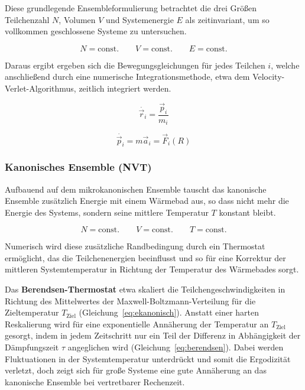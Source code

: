 Diese grundlegende Ensembleformulierung betrachtet die drei Größen Teilchenzahl $N$, Volumen $V$ und Systemenergie $E$ als zeitinvariant, um so vollkommen geschlossene Systeme zu untersuchen.

\begin{equation}
  N = \text{const.}
  \qquad
  V = \text{const.}
  \qquad
  E = \text{const.}
\end{equation}

Daraus ergibt ergeben sich die Bewegungsgleichungen für jedes Teilchen $i$, welche anschließend durch eine numerische Integrationsmethode, etwa dem Velocity-Verlet-Algorithmus, zeitlich integriert werden.

\begin{equation}
  \dot{\vec r_i} = \frac{\vec p_i}{m_i}
\end{equation}

\begin{equation}
  \dot{\vec p_i} = m \vec a_i = \vec F_i(R)
\end{equation}

\subsubsection{Kanonisches Ensemble (NVT)}

Aufbauend auf dem mikrokanonischen Ensemble tauscht das kanonische Ensemble zusätzlich Energie mit einem Wärmebad aus, so dass nicht mehr die Energie des Systems, sondern seine mittlere Temperatur $T$ konstant bleibt.

\begin{equation}
  N = \text{const.}
  \qquad
  V = \text{const.}
  \qquad
  T = \text{const.}
\end{equation}

Numerisch wird diese zusätzliche Randbedingung durch ein Thermostat ermöglicht, das die Teilchenenergien beeinflusst und so für eine Korrektur der mittleren Systemtemperatur in Richtung der Temperatur des Wärmebades sorgt.

Das \textbf{Berendsen-Thermostat}\cite{berendsen_molecular_1984} etwa skaliert die Teilchengeschwindigkeiten in Richtung des Mittelwertes der Maxwell-Boltzmann-Verteilung für die Zieltemperatur $T_\text{Ziel}$ (Gleichung~\ref{eq:ekanonisch}).
Anstatt einer harten Reskalierung wird für eine exponentielle Annäherung der Temperatur an $T_\text{Ziel}$ gesorgt, indem in jedem Zeitschritt nur ein Teil der Differenz in Abhängigkeit der Dämpfungszeit $\tau$ angeglichen wird (Gleichung~\ref{eq:berendsen}).
Dabei werden Fluktuationen in der Systemtemperatur unterdrückt und somit die Ergodizität verletzt, doch zeigt sich für große Systeme eine gute Annäherung an das kanonische Ensemble bei vertretbarer Rechenzeit.

